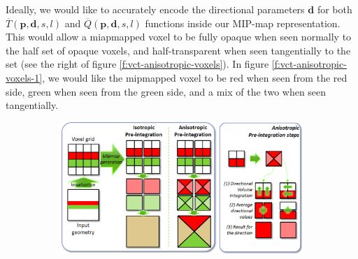 Ideally, we would like to accurately encode the directional parameters $\mathbf{d}$ for both $\overline{T}(\mathbf{p},\mathbf{d},s,l)$ and $\overline{Q}(\mathbf{p},\mathbf{d},s,l)$ functions inside our MIP-map representation. This would allow a miapmapped voxel to be fully opaque when seen normally to the half set of opaque voxels, and half-transparent when seen tangentially to the set (see the right of figure \ref{f:vct-anisotropic-voxels}). In figure \ref{f:vct-anisotropic-voxels-1}, we would like the mipmapped voxel to be red when seen from the red side, green when seen from the green side, and a mix of the two when seen tangentially.

\begin{figure}\label{f:vct-anisotropic-voxels}
	\begin{subfigure}[b]{0.765\textwidth}
		\includegraphics[width=1.0\textwidth]{graphics/vct/vct-10-1}
	\end{subfigure}
	\begin{subfigure}[b]{0.215\textwidth}

\end{subfigure}
\end{figure}
